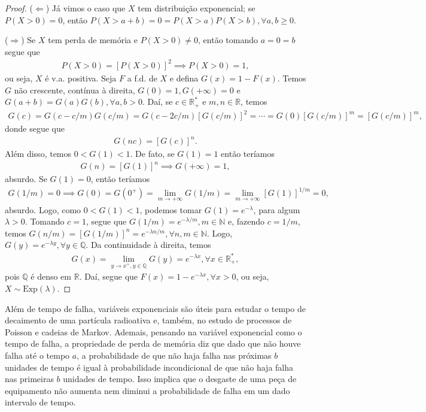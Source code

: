\documentclass[../Notas.tex]{subfiles}
\begin{document}
\begin{proof}
($\Leftarrow$) Já vimos o caso que $X$ tem distribuição exponencial; se $P(X>0) = 0$, então $P(X > a+b) = 0 = P(X>a)P(X>b), \forall a,b\geq 0$.

($\Rightarrow$) Se $X$ tem perda de memória e $P(X > 0) \neq 0$, então tomando $a = 0 = b$ segue que
\begin{align*}
    P(X>0) = [P(X>0)]^2 \implies P(X > 0) = 1, 
\end{align*}
ou seja, $X$ é v.a. positiva. Seja $F$ a f.d. de $X$ e defina $G(x) = 1 - F(x)$. Temos $G$ não crescente, contínua à direita, $G(0) = 1, G(+\infty) = 0$ e $G(a+b) = G(a)G(b), \forall a,b>0$. Daí, se $c\in\mathbb{R}^*_+$ e $m,n\in\mathbb{R}$, temos
\begin{align*}
    G(c) = G(c - c/m)G(c/m) = G(c - 2c/m)[G(c/m)]^2 = \cdots = G(0)[G(c/m)]^m = [G(c/m)]^m,
\end{align*}
donde segue que
\begin{align*}
    G(nc) = [G(c)]^n.
\end{align*}
Além disso, temos $0 < G(1) < 1$. De fato, se $G(1) = 1$ então teríamos
\begin{align*}
    G(n) = [G(1)]^n \implies G(+\infty) = 1,
\end{align*}
absurdo. Se $G(1) = 0$, então teríamos
\begin{align*}
    G(1/m) = 0 \implies G(0) = G(0^+) = \lim_{m\to +\infty} G(1/m) = \lim_{m\to +\infty} [G(1)]^{1/m} = 0,
\end{align*}
absurdo. Logo, como $0 < G(1) < 1$, podemos tomar $G(1) = e^{-\lambda}$, para algum $\lambda > 0$. Tomando $c=1$, segue que $G(1/m) = e^{-\lambda /m}, m\in\mathbb{N}$ e, fazendo $c = 1/m$, temos $G(n/m) = [G(1/m)]^n = e^{-\lambda n/m}, \forall n,m\in\mathbb{N}$. Logo, $G(y) = e^{-\lambda y}, \forall y\in\mathbb{Q}$. Da continuidade à direita, temos
\begin{align*}
    G(x) = \lim_{y\to x^+, y\in\mathbb{Q}} G(y) = e^{-\lambda x}, \forall x\in\mathbb{R}^*_+,
\end{align*}
pois $\mathbb{Q}$ é denso em $\mathbb{R}$. Daí, segue que $F(x) = 1 - e^{-\lambda x}, \forall x>0$, ou seja, $X\sim\text{Exp}(\lambda)$.
\end{proof}

\begin{remark}
Além de tempo de falha, variáveis exponenciais são úteis para estudar o tempo de decaimento de uma partícula radioativa e, também, no estudo de processos de Poisson e cadeias de Markov. Ademais, pensando na variável exponencial como o tempo de falha, a propriedade de perda de memória diz que dado que não houve falha até o tempo $a$, a probabilidade de que não haja falha nas próximas $b$ unidades de tempo é igual à probabilidade incondicional de que não haja falha nas primeiras $b$ unidades de tempo. Isso implica que o desgaste de uma peça de equipamento não aumenta nem diminui a probabilidade de falha em um dado intervalo de tempo.
\end{remark}
\end{document}
